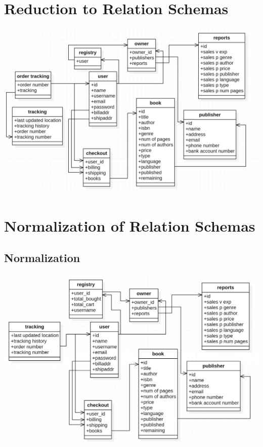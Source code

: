 \documentclass[a4 paper]{article}
\begin{document}
\section{Reduction to Relation Schemas}
{\centering \includegraphics[width=\textwidth/1]{RS_D.png}}
\section{Normalization of Relation Schemas}
\subsection{Normalization}
{\centering \includegraphics[width=\textwidth/1]{NRS_D.png}}
\end{document}
